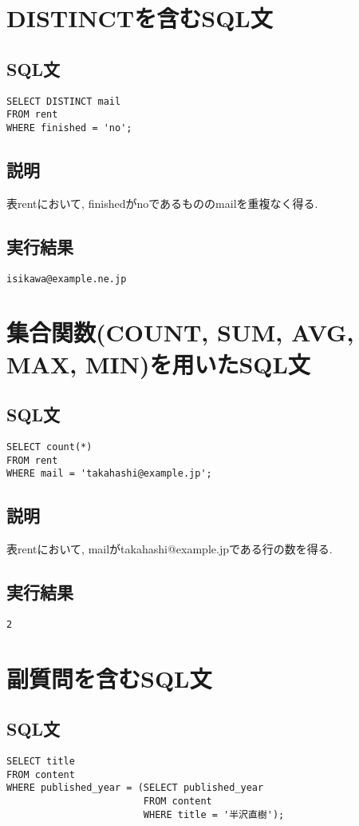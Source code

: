 \documentclass{jarticle}
\begin{document}
\section{DISTINCTを含むSQL文}
\subsection{SQL文}
\begin{verbatim}
SELECT DISTINCT mail 
FROM rent 
WHERE finished = 'no';
\end{verbatim}
\subsection{説明}
表rentにおいて, finishedがnoであるもののmailを重複なく得る.
\subsection{実行結果}
\begin{verbatim}
isikawa@example.ne.jp
\end{verbatim}
\section{集合関数(COUNT, SUM, AVG, MAX, MIN)を用いたSQL文}
\subsection{SQL文}
\begin{verbatim}
SELECT count(*) 
FROM rent 
WHERE mail = 'takahashi@example.jp';
\end{verbatim}
\subsection{説明}
表rentにおいて, mailがtakahashi@example.jpである行の数を得る.
\subsection{実行結果}
\begin{verbatim}
2
\end{verbatim}
\section{副質問を含むSQL文}
\subsection{SQL文}
\begin{verbatim}
SELECT title 
FROM content 
WHERE published_year = (SELECT published_year 
                        FROM content 
                        WHERE title = '半沢直樹');
\end{verbatim}
\end{document}
